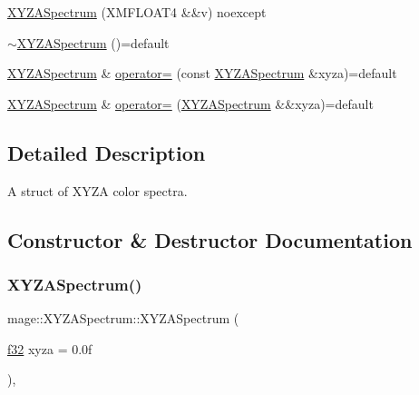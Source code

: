 \begin{DoxyCompactItemize}
\item 
\hyperlink{structmage_1_1_x_y_z_a_spectrum_a1f070e38017938a45880952a4df8c8d5}{X\+Y\+Z\+A\+Spectrum} (X\+M\+F\+L\+O\+A\+T4 \&\&v) noexcept
\item 
\hyperlink{structmage_1_1_x_y_z_a_spectrum_ac50d94c9756b6e8c1ff611dc37fbcfbf}{$\sim$\+X\+Y\+Z\+A\+Spectrum} ()=default
\item 
\hyperlink{structmage_1_1_x_y_z_a_spectrum}{X\+Y\+Z\+A\+Spectrum} \& \hyperlink{structmage_1_1_x_y_z_a_spectrum_a19cd04808e18b2791307195c54846988}{operator=} (const \hyperlink{structmage_1_1_x_y_z_a_spectrum}{X\+Y\+Z\+A\+Spectrum} \&xyza)=default
\item 
\hyperlink{structmage_1_1_x_y_z_a_spectrum}{X\+Y\+Z\+A\+Spectrum} \& \hyperlink{structmage_1_1_x_y_z_a_spectrum_a7afaa89a90d8444691b74c1f4b257aec}{operator=} (\hyperlink{structmage_1_1_x_y_z_a_spectrum}{X\+Y\+Z\+A\+Spectrum} \&\&xyza)=default
\end{DoxyCompactItemize}


\subsection{Detailed Description}
A struct of X\+Y\+ZA color spectra. 

\subsection{Constructor \& Destructor Documentation}
\hypertarget{structmage_1_1_x_y_z_a_spectrum_a1d2fb595a7f0d0d9e37e0bd9f1ce0d74}{}\label{structmage_1_1_x_y_z_a_spectrum_a1d2fb595a7f0d0d9e37e0bd9f1ce0d74} 
\subsubsection{\texorpdfstring{X\+Y\+Z\+A\+Spectrum()}{XYZASpectrum()}\hspace{0.1cm}{\footnotesize\ttfamily [1/10]}}
{\footnotesize\ttfamily mage\+::\+X\+Y\+Z\+A\+Spectrum\+::\+X\+Y\+Z\+A\+Spectrum (\begin{DoxyParamCaption}\item[{\hyperlink{namespacemage_a6a44ad388483959dc4dff9f2aef91431}{f32}}]{xyza = {\ttfamily 0.0f} }\end{DoxyParamCaption})\hspace{0.3cm}{\ttfamily [explicit]}, {\ttfamily [noexcept]}}

